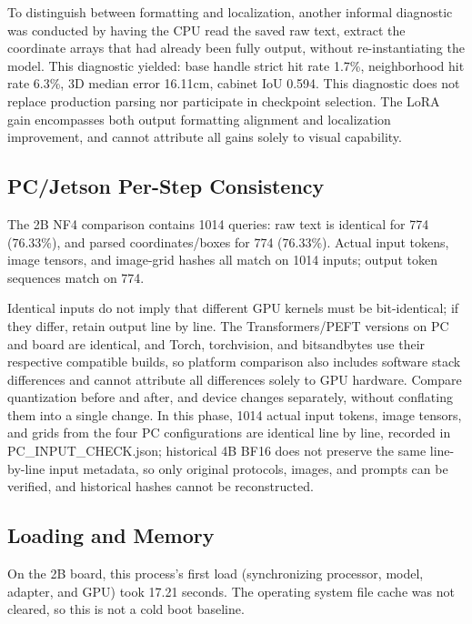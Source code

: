 To distinguish between formatting and localization, another informal diagnostic was conducted by having the CPU read the saved raw text, extract the coordinate arrays that had already been fully output, without re-instantiating the model. This diagnostic yielded: base handle strict hit rate 1.7\%, neighborhood hit rate 6.3\%, 3D median error 16.11cm, cabinet IoU 0.594. This diagnostic does not replace production parsing nor participate in checkpoint selection. The LoRA gain encompasses both output formatting alignment and localization improvement, and cannot attribute all gains solely to visual capability.

\subsection{PC/Jetson Per-Step Consistency}\label{s22-detail-4}

The 2B NF4 comparison contains 1014 queries: raw text is identical for 774 (76.33\%), and parsed coordinates/boxes for 774 (76.33\%). Actual input tokens, image tensors, and image-grid hashes all match on 1014 inputs; output token sequences match on 774.

Identical inputs do not imply that different GPU kernels must be bit-identical; if they differ, retain output line by line. The Transformers/PEFT versions on PC and board are identical, and Torch, torchvision, and bitsandbytes use their respective compatible builds, so platform comparison also includes software stack differences and cannot attribute all differences solely to GPU hardware. Compare quantization before and after, and device changes separately, without conflating them into a single change. In this phase, 1014 actual input tokens, image tensors, and grids from the four PC configurations are identical line by line, recorded in PC\_INPUT\_CHECK.json; historical 4B BF16 does not preserve the same line-by-line input metadata, so only original protocols, images, and prompts can be verified, and historical hashes cannot be reconstructed.

\subsection{Loading and Memory}\label{s22-detail-5}

On the 2B board, this process's first load (synchronizing processor, model, adapter, and GPU) took 17.21 seconds. The operating system file cache was not cleared, so this is not a cold boot baseline.

